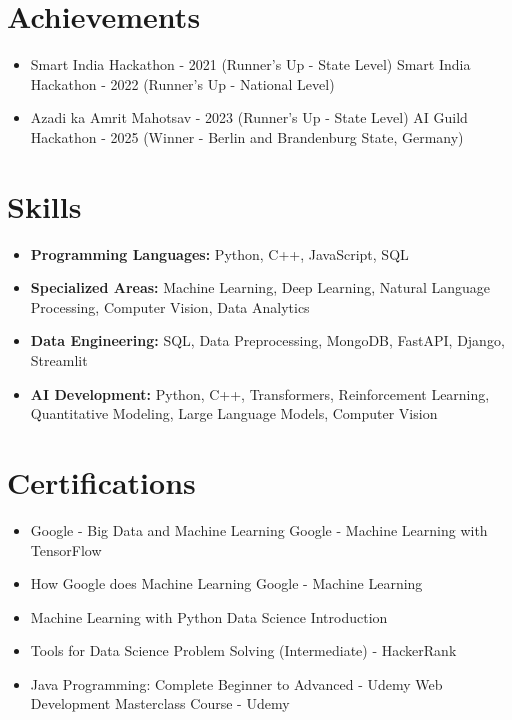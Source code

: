 \documentclass[a4paper,10pt]{article}
\begin{document}
\section*{Achievements}
\begin{itemize}
\item Smart India Hackathon - 2021 (Runner's Up - State Level) \hfill Smart India Hackathon - 2022 (Runner's Up - National Level)
\item Azadi ka Amrit Mahotsav - 2023 (Runner's Up - State Level) \hfill AI Guild Hackathon - 2025 (Winner - Berlin and Brandenburg State, Germany)
\end{itemize}

\section*{Skills}
\begin{itemize}
  \item \textbf{Programming Languages:} Python, C++, JavaScript, SQL
  \item \textbf{Specialized Areas:} Machine Learning, Deep Learning, Natural Language Processing, Computer Vision, Data Analytics
  \item \textbf{Data Engineering:} SQL, Data Preprocessing, MongoDB, FastAPI, Django, Streamlit
  \item \textbf{AI Development:} Python, C++, Transformers, Reinforcement Learning, Quantitative Modeling, Large Language Models, Computer Vision
\end{itemize}

\section*{Certifications}
\begin{itemize}
\item Google - Big Data and Machine Learning \hfill Google - Machine Learning with TensorFlow
\item How Google does Machine Learning \hfill Google - Machine Learning
\item Machine Learning with Python \hfill Data Science Introduction
\item Tools for Data Science \hfill Problem Solving (Intermediate) - HackerRank
\item Java Programming: Complete Beginner to Advanced - Udemy \hfill Web Development Masterclass Course - Udemy
\end{itemize}
\end{document}
